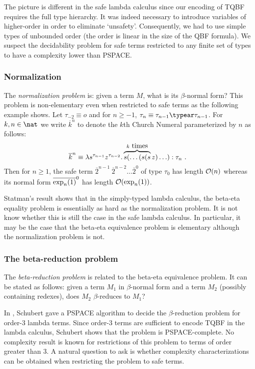 The picture is different in the safe lambda calculus since our
encoding of TQBF requires the full type hierarchy. It
was indeed necessary to introduce variables of higher-order in order
to eliminate `unsafety'. Consequently, we had to use simple types of
unbounded order (the order is linear in the size of the QBF
formula). We suspect the decidability problem for safe terms
restricted to any finite set of types to have a complexity lower
than PSPACE.


\subsubsection{Normalization}
The \emph{normalization problem} is: given a term $M$, what is its $\beta$-normal form? This problem is non-elementary even when restricted to safe terms as the following example shows. Let $\tau_{-2}
\equiv o$ and for $n\geq -1$, $\tau_n \equiv \tau_{n-1}\typear
\tau_{n-1}$. For $k,n\in \nat$ we write $\overline{k}^n$ to denote
the $k$th Church Numeral parameterized by $n$ as follows:
$$\overline{k}^n \equiv \lambda s^{\tau_{n-1}}
z^{\tau_{n-2}} . \overbrace{s( \ldots (s (s}^{k\hbox{ times}}z)
\ldots) : \tau_n \ .$$ Then for $n\geq1$, the safe term
$\overline{2}^{n-1}~\overline{2}^{n-2}\ldots \overline{2}^0$ of type
$\tau_0$ has length $\mathcal{O}(n)$ whereas its normal form
$\overline{\exp_{n}(1)}^0$ has length $\mathcal{O}(\exp_{n}(1))$.

Statman's result shows that in the simply-typed lambda calculus, the beta-eta equality problem is essentially as hard as the
normalization problem. It is not know whether this is still the case in the safe lambda calculus. In particular, it may be the case that the
beta-eta equivalence problem is elementary although the normalization problem is not.

\subsubsection{The beta-reduction problem}
The \emph{beta-reduction problem} is related to the beta-eta equivalence problem. It can be stated as follows: given a term $M_1$ in $\beta$-normal form and a term $M_2$ (possibly containing redexes), does $M_2$ $\beta$-reduces to $M_1$?

In \cite{schubert2001cbr}, Schubert
gave a PSPACE algorithm to decide the $\beta$-reduction problem for order-$3$
lambda terms. Since order-$3$ terms are sufficient to encode TQBF in the lambda calculus, Schubert shows that the problem is PSPACE-complete. No complexity result is known for restrictions of this problem to terms of order greater than $3$. A natural question to ask is whether complexity characterizations can be obtained when restricting the problem to safe terms.


